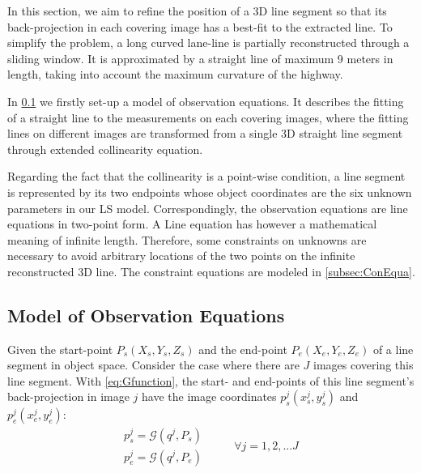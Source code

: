 In this section, we aim to refine the position of a 3D line segment so that its back-projection in each covering image has a best-fit to the extracted line. To simplify the problem, a long curved lane-line is partially reconstructed through a sliding window. It is approximated by a straight line of maximum 9 meters in length, taking into account the maximum curvature of the highway.

In \cref{subsec:ObsEqua} we firstly set-up a model of observation equations. It describes the fitting of a straight line to the measurements on each covering images, where the fitting lines on different images are transformed from a single 3D straight line segment through extended collinearity equation.

Regarding the fact that the collinearity is a point-wise condition, a line segment is represented by its two endpoints whose object coordinates are the six unknown parameters in our LS model. Correspondingly, the observation equations are line equations in two-point form. A Line equation has however a mathematical meaning of infinite length. Therefore, some constraints on unknowns are necessary to avoid arbitrary locations of the two points on the infinite reconstructed 3D line. The constraint equations are modeled in \cref{subsec:ConEqua}.





\subsection{Model of Observation Equations}
\label{subsec:ObsEqua}

Given the start-point $P_s(X_s,Y_s,Z_s)$ and the end-point $P_e(X_e,Y_e,Z_e)$ of a line segment in object space. Consider the case where there are $J$ images covering this line segment. With \cref{eq:Gfunction}, the start- and end-points of this line segment's back-projection in image $j$ have the image coordinates $p^j_s(x^j_s,y^j_s)$ and $p^j_e(x^j_e,y^j_e)$:
\begin{equation} \label{eq:obsmodel-collinearity}
\begin{split}
p^j_s = \mathcal{G}(q^j,P_s)\\
p^j_e = \mathcal{G}(q^j,P_e)
\end{split}
\qquad
\begin{split}
\forall j=1,2,...J
\end{split}
\end{equation}


